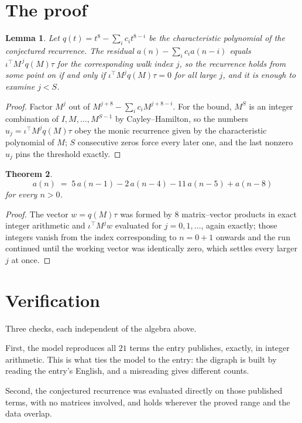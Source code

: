 \documentclass[11pt,a4paper]{article}
\theoremstyle{plain}
\newtheorem{theorem}{Theorem}
\newtheorem{lemma}[theorem]{Lemma}
\theoremstyle{definition}
\begin{document}
\section{The proof}

\begin{lemma}\label{lem:crit}
Let $q(t)=t^{8}-\sum_i c_it^{8-i}$ be the characteristic polynomial of the
conjectured recurrence. The residual $a(n)-\sum_ic_ia(n-i)$ equals
$\iota^{\!\top}M^{\,j}q(M)\tau$ for the corresponding walk index $j$, so the recurrence
holds from some point on if and only if $\iota^{\!\top}M^{j}q(M)\tau=0$ for all large $j$,
and it is enough to examine $j<S$.
\end{lemma}

\begin{proof}
Factor $M^{j}$ out of $M^{j+8}-\sum_ic_iM^{j+8-i}$. For the bound, $M^{S}$
is an integer combination of $I,M,\dots,M^{S-1}$ by Cayley--Hamilton, so the numbers
$u_j=\iota^{\!\top}M^{j}q(M)\tau$ obey the monic recurrence given by the characteristic
polynomial of $M$; $S$ consecutive zeros force every later one, and the last nonzero $u_j$
pins the threshold exactly.
\end{proof}

\begin{theorem}
\[
a(n)\;=\;5\,a(n-1) - 2\,a(n-4) - 11\,a(n-5) + a(n-8)
\]
for every $n>0$.
\end{theorem}

\begin{proof}
The vector $w=q(M)\tau$ was formed by $8$ matrix--vector products in exact integer
arithmetic and $\iota^{\!\top}M^{j}w$ evaluated for $j=0,1,\dots$, again exactly; those
integers vanish from the index corresponding to $n=0+1$ onwards and the run continued
until the working vector was identically zero, which settles every larger $j$ at once.
\end{proof}

\section{Verification}

Three checks, each independent of the algebra above.

First, the model reproduces all $21$ terms the entry publishes, exactly, in integer
arithmetic. This is what ties the model to the entry: the digraph is built by reading the
entry's English, and a misreading gives different counts.

Second, the conjectured recurrence was evaluated directly on those published terms, with no
matrices involved, and holds wherever the proved range and the data overlap.
\end{document}
